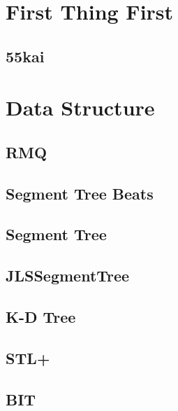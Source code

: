 \section{First Thing First}
\subsection{55kai}
\raggedbottom
\hrulefill

\section{Data Structure}
\subsection{RMQ}
\raggedbottom
\hrulefill
\subsection{Segment Tree Beats}
\raggedbottom
\hrulefill
\subsection{Segment Tree}
\raggedbottom
\hrulefill
\subsection{JLSSegmentTree}
\raggedbottom
\hrulefill
\subsection{K-D Tree}
\raggedbottom
\hrulefill
\subsection{STL+}
\raggedbottom
\hrulefill
\subsection{BIT}
\raggedbottom
\hrulefill
